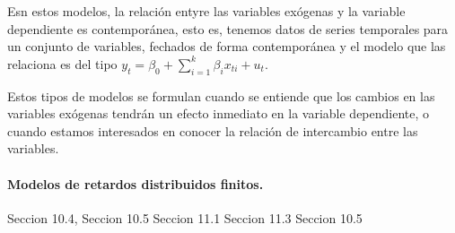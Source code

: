 Esn estos modelos, la relaci\'on entyre las variables ex\'ogenas y la variable dependiente es contempor\'anea, esto es, tenemos datos de series temporales para un conjunto de variables, fechados de forma contempor\'anea y el modelo que las relaciona es del tipo $y_t=\beta_0+\sum_{i=1}^k\beta_ix_{ti}+u_t$.

Estos tipos de modelos se formulan cuando se entiende que los cambios en las variables ex\'ogenas tendr\'an un efecto inmediato en la variable dependiente, o cuando estamos interesados en conocer la relaci\'on de intercambio entre las variables.

\paragraph{Modelos de retardos distribuidos finitos.}




Seccion 10.4, 
Seccion 10.5
Seccion 11.1
Seccion 11.3
Seccion 10.5
